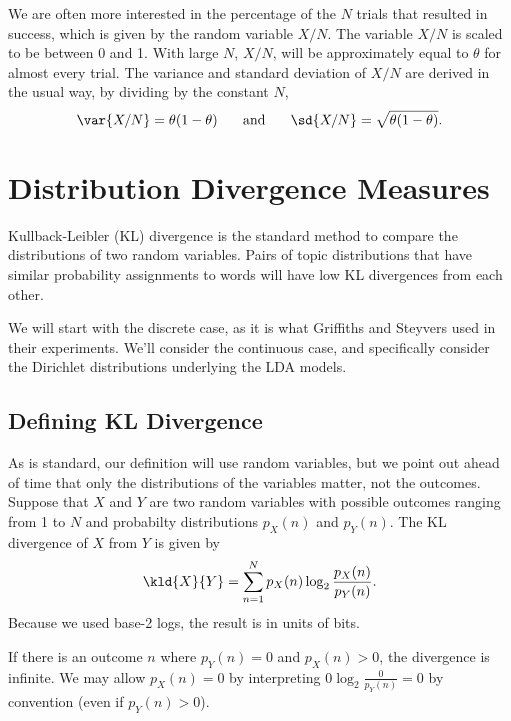We are often more interested in the percentage of the $N$ trials that
resulted in success, which is given by the random variable $X/N$.  The
variable $X/N$ is scaled to be between 0 and 1.  With large $N$,
$X/N$, will be approximately equal to $\theta$ for almost every trial.
The variance and standard deviation of $X/N$ are derived in the usual
way, by dividing by the constant $N$,
%
\begin{equation}
\var{X/N} = \theta (1 - \theta) 
\hspace*{0.25in}
\mbox{and}
\hspace*{0.25in}
\sd{X/N} = \sqrt{\theta (1-\theta)}.
\end{equation}



\section{Distribution Divergence Measures}\label{section:stats-divergence}

Kullback-Leibler (KL) divergence is the standard method to compare the
distributions of two random variables.  Pairs of topic distributions
that have similar probability assignments to words will have low KL
divergences from each other.

We will start with the discrete case, as it is what Griffiths and
Steyvers used in their experiments.  We'll consider the continuous
case, and specifically consider the Dirichlet distributions underlying
the LDA models.

\subsection{Defining KL Divergence}

As is standard, our definition will use random variables, but we point
out ahead of time that only the distributions of the variables matter,
not the outcomes.  Suppose that $X$ and $Y$ are two random variables
with possible outcomes ranging from 1 to $N$ and probabilty
distributions $p_X(n)$ and $p_Y(n)$.  The KL divergence of $X$ from
$Y$ is given by
%
\begin{equation}
\kld{X}{Y}
= \sum_{n=1}^N p_X(n) \log_2 \frac{p_X(n)}{p_Y(n)}.
\end{equation}
%
Because we used base-2 logs, the result is in units of bits.  

If there is an outcome $n$ where $p_Y(n) = 0$ and $p_X(n) > 0$, the
divergence is infinite.  We may allow $p_X(n) = 0$ by interpreting $0
\log_2 \frac{0}{p_Y(n)} = 0$ by convention (even if $p_Y(n) > 0$).

